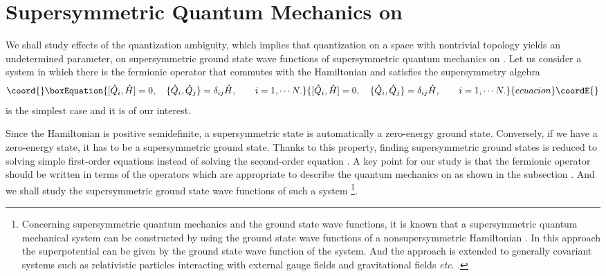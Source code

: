\documentclass[a4paper,12pt]{article}
\begin{document}
\section{Supersymmetric Quantum Mechanics on \coordHE{}}
We shall study effects of the quantization ambiguity, which implies 
that quantization on a space with nontrivial topology yields an 
undetermined parameter, on supersymmetric ground state wave functions of 
supersymmetric quantum mechanics on \coordHE{}. 
Let us consider a system in which there is the fermionic operator 
\coordHE{} that commutes with the Hamiltonian \coordHE{} and 
satisfies the supersymmetry algebra
\begin{equation}\coord{}\boxEquation{
[{\hat Q}_i, {\hat H} ]=0,\quad 
\{{\hat Q}_i, {\hat Q}_j\}=\delta_{ij} \hat H,
\qquad i=1,\cdots N.
\label{susy}
}{
[{\hat Q}_i, {\hat H} ]=0,\quad 
\{{\hat Q}_i, {\hat Q}_j\}=\delta_{ij} \hat H,
\qquad i=1,\cdots N.
}{ecuacion}\coordE{}\end{equation} 
\coordHE{} is the simplest case and it is of our interest. 
\par
Since the Hamiltonian is positive semidefinite, a supersymmetric 
state \coordHE{} is automatically a zero-energy ground state.
Conversely, if we have a zero-energy state, it has to be a supersymmetric 
ground state. Thanks to this property, finding supersymmetric ground states
is reduced to solving simple first-order equations
instead of solving the second-order equation \coordHE{}.
A key point for our study is that the fermionic 
operator \coordHE{} should be written in terms of the operators 
which are appropriate
to describe the quantum mechanics on \coordHE{} as shown in the 
subsection \coordHE{}. 
And we shall study the supersymmetric ground state wave functions 
of such a system \footnote{Concerning supersymmetric 
quantum mechanics and the ground state wave functions, it is known 
that a supersymmetric quantum mechanical system can be constructed by 
using the ground state 
wave functions of a nonsupersymmetric Hamiltonian \cite{gozzi}. 
In this approach the superpotential can be given by
the ground state 
wave function of the system. And the approach is extended to 
generally covariant systems such as relativistic particles interacting with 
external gauge fields and gravitational fields {\it etc}. \cite{gamboa}.}.
\par
\end{document}
